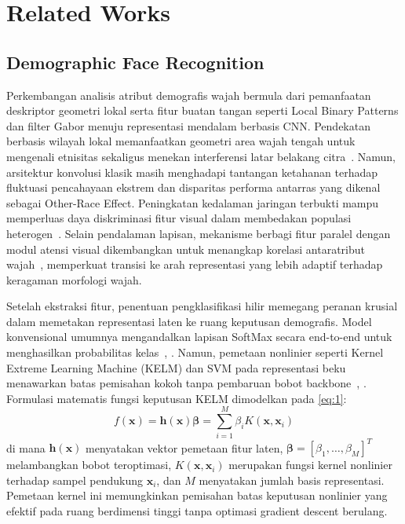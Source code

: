 \section{Related Works}
\label{sec:related_works}

\subsection{Demographic Face Recognition}
\label{sec:demographic_face_recognition}

Perkembangan analisis atribut demografis wajah bermula dari pemanfaatan deskriptor geometri lokal serta fitur buatan tangan seperti Local Binary Patterns dan filter Gabor menuju representasi mendalam berbasis CNN. Pendekatan berbasis wilayah lokal memanfaatkan geometri area wajah tengah untuk mengenali etnisitas sekaligus menekan interferensi latar belakang citra~\cite{ref11}. Namun, arsitektur konvolusi klasik masih menghadapi tantangan ketahanan terhadap fluktuasi pencahayaan ekstrem dan disparitas performa antarras yang dikenal sebagai Other-Race Effect. Peningkatan kedalaman jaringan terbukti mampu memperluas daya diskriminasi fitur visual dalam membedakan populasi heterogen~\cite{ref13}. Selain pendalaman lapisan, mekanisme berbagi fitur paralel dengan modul atensi visual dikembangkan untuk menangkap korelasi antaratribut wajah~\cite{ref16}, memperkuat transisi ke arah representasi yang lebih adaptif terhadap keragaman morfologi wajah.

Setelah ekstraksi fitur, penentuan pengklasifikasi hilir memegang peranan krusial dalam memetakan representasi laten ke ruang keputusan demografis. Model konvensional umumnya mengandalkan lapisan SoftMax secara end-to-end untuk menghasilkan probabilitas kelas~\cite{ref11}, \cite{ref18}. Namun, pemetaan nonlinier seperti Kernel Extreme Learning Machine (KELM) dan SVM pada representasi beku menawarkan batas pemisahan kokoh tanpa pembaruan bobot backbone~\cite{ref13}, \cite{ref12}. Formulasi matematis fungsi keputusan KELM dimodelkan pada \eqref{eq:1}:
\begin{equation}
f(\mathbf{x}) = \mathbf{h}(\mathbf{x})\boldsymbol{\beta} = \sum_{i=1}^M \beta_i K(\mathbf{x}, \mathbf{x}_i)
\label{eq:1}
\end{equation}
di mana $\mathbf{h}(\mathbf{x})$ menyatakan vektor pemetaan fitur laten, $\boldsymbol{\beta} = [\beta_1, \dots, \beta_M]^T$ melambangkan bobot teroptimasi, $K(\mathbf{x}, \mathbf{x}_i)$ merupakan fungsi kernel nonlinier terhadap sampel pendukung $\mathbf{x}_i$, dan $M$ menyatakan jumlah basis representasi. Pemetaan kernel ini memungkinkan pemisahan batas keputusan nonlinier yang efektif pada ruang berdimensi tinggi tanpa optimasi gradient descent berulang.

